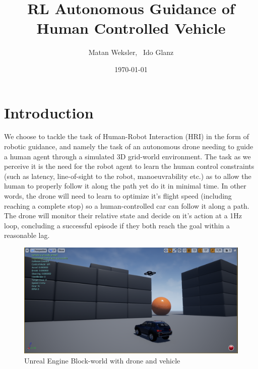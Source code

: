 \documentclass[a4paper,11pt]{article}
\begin{document}
\title{RL Autonomous Guidance of Human Controlled Vehicle}
\author{Matan Weksler, \  Ido Glanz
}
\date{\today}
\maketitle


\section{Introduction}

We choose to tackle the task of Human-Robot Interaction (HRI) in the form of robotic guidance, and namely the task of an autonomous drone needing to guide a human agent through a simulated 3D grid-world environment. The task as we perceive it is the need for the robot agent to learn the human control constraints (such as latency, line-of-sight to the robot, manoeuvrability etc.) as to allow the human to properly follow it along the path yet do it in minimal time. In other words, the drone will need to learn to optimize it’s flight speed (including reaching a complete stop) so a human-controlled car can follow it along a path. The drone will monitor their relative state and decide on it’s action at a 1Hz loop, concluding a successful episode if they both reach the goal within a reasonable lag.

\begin{figure}[!h]
    \centering
    \includegraphics[width=.8\textwidth]{car_and_drone_1.png}
    \caption{Unreal Engine Block-world with drone and vehicle}
    \label{Block-world}
\end{figure}
\end{document}
